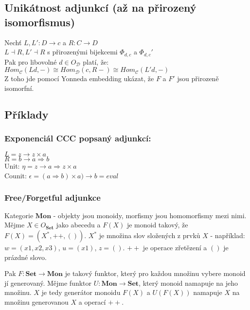 \documentclass{article}
\begin{document}
\subsection*{Unikátnost adjunkcí (až na přirozený isomorfismus)}
Nechť $L,L': D \to c$ a $R: C \to D$\\
$L \dashv{} R, L' \dashv{} R$ s přirozenými bijekcemi $\Phi_{d,c}$ a $\Phi_{d, c}'$\\
Pak pro libovolné $d \in O_\mathcal{D}$ platí, že:\\
$Hom_\mathcal{C}(Ld,-) \cong{} Hom_\mathcal{D}(c, R-)\cong{} Hom_\mathcal{C}(L'd, -)$\\
Z toho jde pomocí Yonneda embedding ukázat, že $F$ a $F'$ jsou přirozeně isomorfní.

\subsection*{Příklady}
\subsubsection*{Exponenciál CCC popsaný adjunkcí:}
$L=z \to z \times a$\\
$R = b \to a \Rightarrow b$\\
Unit: $\eta = z \to a \Rightarrow z \times a$\\
Counit: $\epsilon = (a\Rightarrow b) \times a) \to b = eval$
\subsubsection*{Free/Forgetful adjunkce}
Kategorie $\textbf{Mon}$ - objekty jsou monoidy, morfismy jsou homomorfismy mezi nimi. Mějme $X \in O_{\textbf{Set}}$ jako abecedu a $F(X)$ je monoid takový, že $F(X) = (X^*, ++, ())$. $X^*$ je množina slov složených z prvků $X$ - například: $w=(x1,x2,x3)$, $u=(x1)$, $z=()$. $++$ je operace zřetězení a $()$ je prázdné slovo. 

Pak $F:\textbf{Set} \rightarrow \textbf{Mon}$ je takový funktor, který pro každou množinu vybere monoid jí generovaný. Mějme funktor $U:\textbf{Mon} \rightarrow \textbf{Set}$, který monoid namapuje na jeho množinu. $X$ je tedy generátor monoidu $F(X)$ a $U(F(X))$ namapuje $X$ na množinu generovanou $X$ a operací $++$.
\end{document}
